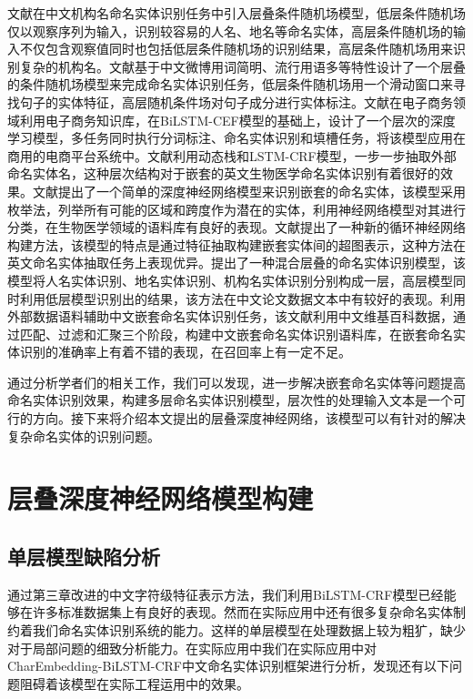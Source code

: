 \documentclass[winfonts,master,oneside,nobackinfo]{njuthesis}
\begin{document}
文献\cite{junsheng}在中文机构名命名实体识别任务中引入层叠条件随机场模型，低层条件随机场仅以观察序列为输入，识别较容易的人名、地名等命名实体，高层条件随机场的输入不仅包含观察值同时也包括低层条件随机场的识别结果，高层条件随机场用来识别复杂的机构名。文献\cite{Yixue}基于中文微博用词简明、流行用语多等特性设计了一个层叠的条件随机场模型来完成命名实体识别任务，低层条件随机场用一个滑动窗口来寻找句子的实体特征，高层随机条件场对句子成分进行实体标注。文献\cite{taobao}在电子商务领域利用电子商务知识库，在BiLSTM-CEF模型的基础上，设计了一个层次的深度学习模型，多任务同时执行分词标注、命名实体识别和填槽任务，将该模型应用在商用的电商平台系统中。文献\cite{Meizhi}利用动态栈和LSTM-CRF模型，一步一步抽取外部命名实体名，这种层次结构对于嵌套的英文生物医学命名实体识别有着很好的效果。文献\cite{Mohammad}提出了一个简单的深度神经网络模型来识别嵌套的命名实体，该模型采用枚举法，列举所有可能的区域和跨度作为潜在的实体，利用神经网络模型对其进行分类，在生物医学领域的语料库有良好的表现。文献\cite{Arzoo}提出了一种新的循环神经网络构建方法，该模型的特点是通过特征抽取构建嵌套实体间的超图表示，这种方法在英文命名实体抽取任务上表现优异。\cite{Jia}提出了一种混合层叠的命名实体识别模型，该模型将人名实体识别、地名实体识别、机构名实体识别分别构成一层，高层模型同时利用低层模型识别出的结果，该方法在中文论文数据文本中有较好的表现。\cite{yanqun}利用外部数据语料辅助中文嵌套命名实体识别任务，该文献利用中文维基百科数据，通过匹配、过滤和汇聚三个阶段，构建中文嵌套命名实体识别语料库，在嵌套命名实体识别的准确率上有着不错的表现，在召回率上有一定不足。

通过分析学者们的相关工作，我们可以发现，进一步解决嵌套命名实体等问题提高命名实体识别效果，构建多层命名实体识别模型，层次性的处理输入文本是一个可行的方向。接下来将介绍本文提出的层叠深度神经网络，该模型可以有针对的解决复杂命名实体的识别问题。

\section{层叠深度神经网络模型构建}

\subsection{单层模型缺陷分析}

通过第三章改进的中文字符级特征表示方法，我们利用BiLSTM-CRF模型已经能够在许多标准数据集上有良好的表现。然而在实际应用中还有很多复杂命名实体制约着我们命名实体识别系统的能力。这样的单层模型在处理数据上较为粗犷，缺少对于局部问题的细致分析能力。在实际应用中我们在实际应用中对CharEmbedding-BiLSTM-CRF中文命名实体识别框架进行分析，发现还有以下问题阻碍着该模型在实际工程运用中的效果。
\end{document}
